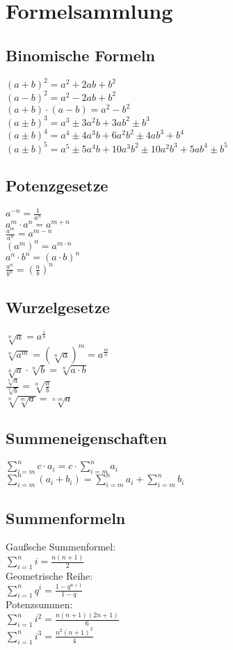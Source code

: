 \section{Formelsammlung}
\subsection*{Binomische Formeln}
$(a+b)^2 = a^2 + 2ab + b^2$\\
$(a-b)^2 = a^2 - 2ab + b^2$\\
$(a+b) \cdot (a-b) = a^2 - b^2$\\
$(a \pm b)^3 = a^3 \pm 3 a^2 b + 3 a b^2 \pm b^3$\\
$(a \pm b)^4 = a^4 \pm 4 a^3 b + 6 a^2 b^2 \pm 4 a b^3 + b^4$\\
$(a \pm b)^5 = a^5 \pm 5 a^4 b + 10 a^3 b^2 \pm 10 a^2 b^3 + 5 a b^4 \pm b^5$
\subsection*{Potenzgesetze}
$a^{-n}=\frac{1}{a^n}$\\
$a^m\cdot a^n=a^{m+n}$\\
$\frac{a^m}{a^n}=a^{m-n}$\\
$(a^m)^n=a^{m\cdot n}$\\
$a^n\cdot b^n=(a\cdot b)^n$\\
$\frac{a^n}{b^n}=(\frac{a}{b})^n$
\subsection*{Wurzelgesetze}
$\sqrt[n]{a}=a^{\frac{1}{n}}$\\
$\sqrt[n]{a^m}=(\sqrt[n]{a})^m=a^{\frac{m}{n}}$\\
$\sqrt[n]{a}\cdot\sqrt[n]{b}=\sqrt[n]{a\cdot b}$\\
$\frac{\sqrt[n]{a}}{\sqrt[n]{b}}=\sqrt[n]{\frac{a}{b}}$\\
$\sqrt[n]{\sqrt[m]{a}}=\sqrt[{n\cdot m}]{a}$
\subsection*{Summeneigenschaften}
$\sum_{i=m}^n c\cdot a_i=c\cdot \sum_{i=m}^n a_i$\\
$\sum_{i=m}^n (a_i+b_i)=\sum_{i=m}^n a_i + \sum_{i=m}^n b_i$
\subsection*{Summenformeln}
Gaußsche Summenformel:\\
$\sum_{i=1}^n i=\frac{n(n+1)}{2}$\\
Geometrische Reihe:\\
$\sum_{i=1}^n q^i=\frac{1-q^{n+1}}{1-q}$\\
Potenzsummen:\\
$\sum_{i=1}^n i^2=\frac{n(n+1)(2n+1)}{6}$\\
$\sum_{i=1}^n i^3=\frac{n^2(n+1)^2}{4}$

